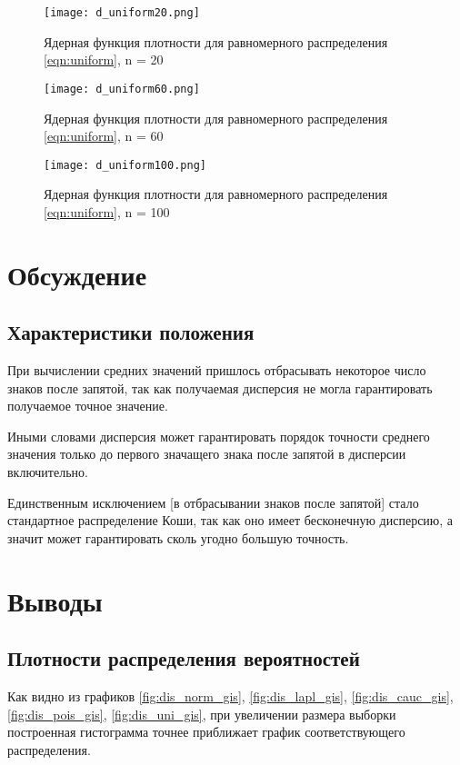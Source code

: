 \documentclass[a4]{article}
\begin{document}
\begin{center}
    \begin{figure}[H]
 \caption{Ядерная функция плотности для равномерного распределения \eqref{eqn:uniform}, n = 20}
\texttt{[image: d\_uniform20.png]}
\end{figure}
    \begin{figure}[H]
 \caption{Ядерная функция плотности для равномерного распределения \eqref{eqn:uniform}, n = 60}
\texttt{[image: d\_uniform60.png]}
\end{figure}
    \begin{figure}[H]
 \caption{Ядерная функция плотности для равномерного распределения \eqref{eqn:uniform}, n = 100}
\texttt{[image: d\_uniform100.png]}
\end{figure}
\end{center}
\section{Обсуждение}
\subsection{Характеристики положения}
\par При вычислении средних значений пришлось отбрасывать некоторое число знаков после запятой, так как получаемая дисперсия не могла гарантировать получаемое точное значение. \par Иными словами дисперсия может гарантировать порядок точности среднего значения только до первого значащего знака после запятой в дисперсии включительно. \par Единственным исключением [в отбрасывании знаков после запятой] стало стандартное распределение Коши, так как оно имеет бесконечную дисперсию, а значит может гарантировать сколь угодно большую точность.

\section{Выводы}

\subsection{Плотности распределения вероятностей}
\par Как видно из графиков \eqref{fig:dis_norm_gis}, \eqref{fig:dis_lapl_gis}, \eqref{fig:dis_cauc_gis}, \eqref{fig:dis_pois_gis}, \eqref{fig:dis_uni_gis}, при увеличении размера выборки построенная гистограмма точнее приближает график соответствующего распределения.
\end{document}
